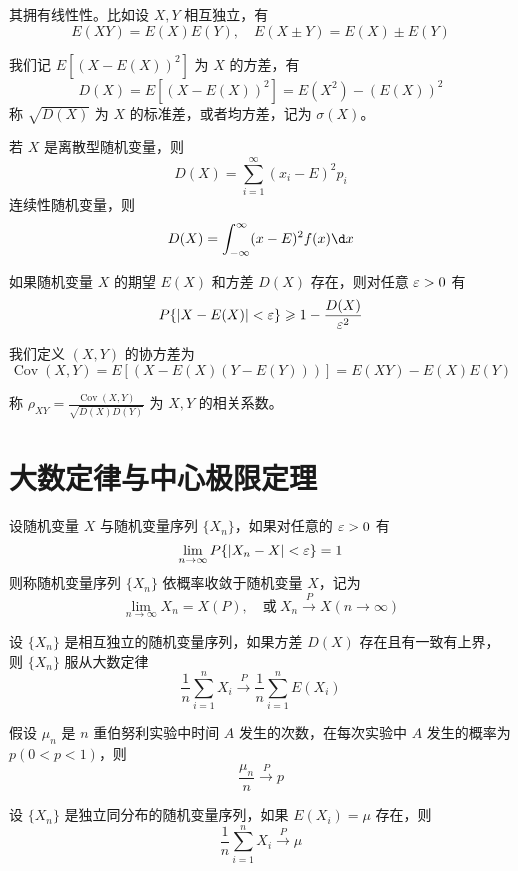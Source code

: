 其拥有线性性。比如设 $X, Y$ 相互独立，有
\[ E(X Y) = E(X) E(Y), \quad E(X \pm Y) = E(X) \pm E(Y) \]

我们记 $E[(X - E(X))^2]$ 为 $X$ 的方差，有
\[ D(X) = E[(X - E(X))^2] = E(X^2) - (E(X))^2 \]
称 $\sqrt{D(X)}$ 为 $X$ 的标准差，或者均方差，记为 $\sigma(X)$。

若 $X$ 是离散型随机变量，则
\[ D(X) = \sum_{i=1}^{\infty} (x_i - E)^2 p_i \]
连续性随机变量，则
\[ D(X) = \int_{-\infty}^{\infty} (x-E)^2 f(x) \d x \]

\begin{theorem}[切比雪夫不等式]
	如果随机变量 $X$ 的期望 $E(X)$ 和方差 $D(X)$ 存在，则对任意 $\varepsilon > 0$ 有
	\[ P\{|X - E(X)| < \varepsilon\} \geqslant 1 - \frac{D(X)}{\varepsilon^2} \]
\end{theorem}

我们定义 $(X, Y)$ 的协方差为
\[ \operatorname{Cov}(X, Y) = E[(X - E(X)(Y - E(Y)))] = E(XY) - E(X) E(Y) \]

称 $\rho_{XY} = \frac{\operatorname{Cov}(X, Y)}{\sqrt{D(X) D(Y)}}$ 为 $X, Y$ 的相关系数。

\section{大数定律与中心极限定理}

设随机变量 $X$ 与随机变量序列 $\{X_n\}$，如果对任意的 $\varepsilon > 0$ 有
\[ \lim_{n \to \infty} P\{|X_n - X| < \varepsilon \} =1 \]
则称随机变量序列 $\{X_n\}$ 依概率收敛于随机变量 $X$，记为
\[ \lim_{n \to \infty} X_n = X(P), \quad \text{或}\ X_n \stackrel{P}{\longrightarrow} X(n \to \infty) \]

\begin{theorem}[切比雪夫大数定律]
	设 $\{X_n\}$ 是相互独立的随机变量序列，如果方差 $D(X)$ 存在且有一致有上界，则 $\{X_n\}$ 服从大数定律
	\[ \frac{1}{n} \sum_{i=1}^n X_i \stackrel{P}{\longrightarrow} \frac{1}{n} \sum_{i=1}^n E(X_i) \]
\end{theorem}

\begin{theorem}[伯努利大数定律]
	假设 $\mu_n$ 是 $n$ 重伯努利实验中时间 $A$ 发生的次数，在每次实验中 $A$ 发生的概率为 $p(0 < p < 1)$，则
	\[ \frac{\mu_n}{n} \stackrel{P}{\longrightarrow} p \]
\end{theorem}

\begin{theorem}[辛钦大数定律]
	设 $\{X_n\}$ 是独立同分布的随机变量序列，如果 $E(X_i) = \mu$ 存在，则
	\[ \frac{1}{n} \sum_{i=1}^n X_i \stackrel{P}{\longrightarrow} \mu \]
\end{theorem}

